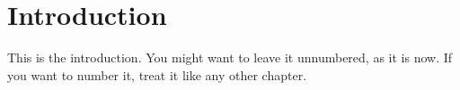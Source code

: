 \section*{Introduction}  %

This is the introduction. You might want to leave it unnumbered, as it is now. If you want to number it, treat it like any other chapter.